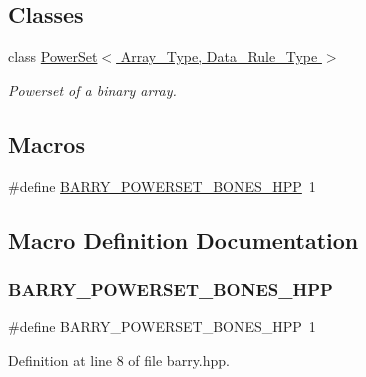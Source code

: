 \subsection*{Classes}
\begin{DoxyCompactItemize}
\item 
class \hyperlink{class_power_set}{Power\+Set$<$ Array\+\_\+\+Type, Data\+\_\+\+Rule\+\_\+\+Type $>$}
\begin{DoxyCompactList}\small\item\em Powerset of a binary array. \end{DoxyCompactList}\end{DoxyCompactItemize}
\subsection*{Macros}
\begin{DoxyCompactItemize}
\item 
\#define \hyperlink{barry_8hpp_a08303757f391a3a39e22f83083f39948}{B\+A\+R\+R\+Y\+\_\+\+P\+O\+W\+E\+R\+S\+E\+T\+\_\+\+B\+O\+N\+E\+S\+\_\+\+H\+PP}~1
\end{DoxyCompactItemize}


\subsection{Macro Definition Documentation}
\mbox{\label{barry_8hpp_a08303757f391a3a39e22f83083f39948}} 
\subsubsection{\texorpdfstring{B\+A\+R\+R\+Y\+\_\+\+P\+O\+W\+E\+R\+S\+E\+T\+\_\+\+B\+O\+N\+E\+S\+\_\+\+H\+PP}{BARRY\_POWERSET\_BONES\_HPP}}
{\footnotesize\ttfamily \#define B\+A\+R\+R\+Y\+\_\+\+P\+O\+W\+E\+R\+S\+E\+T\+\_\+\+B\+O\+N\+E\+S\+\_\+\+H\+PP~1}



Definition at line 8 of file barry.\+hpp.

